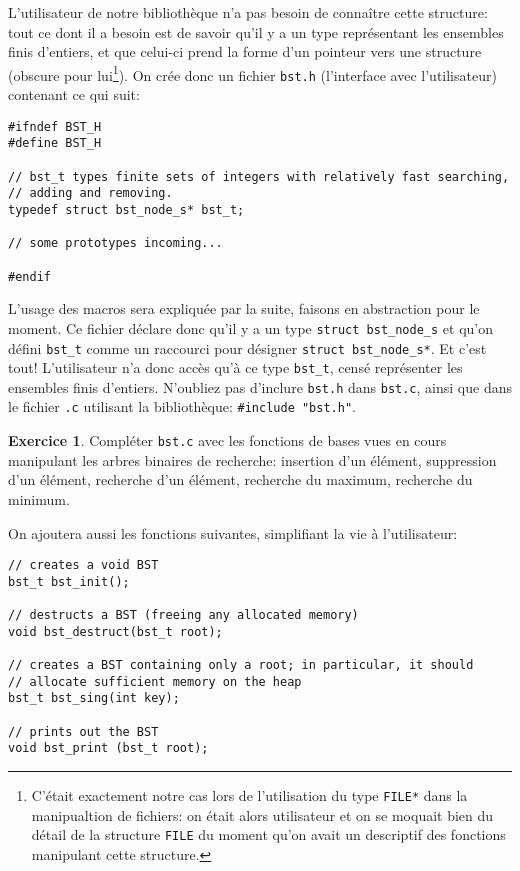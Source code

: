 \documentclass[french,a4paper]{article}
\theoremstyle{definition}
\newtheorem{exercise}{Exercice}
\theoremstyle{remark}
\newcommand{\shell}[1]{\lstinline[style={},style=sh]|#1|}
\newcommand{\inlinec}[1]{\lstinline[style=C]°#1°}
\begin{document}
L'utilisateur de notre bibliothèque n'a pas besoin de connaître cette
structure: tout ce dont il a besoin est de savoir qu'il y a un type
représentant les ensembles finis d'entiers, et que celui-ci prend la
forme d'un pointeur vers une structure (obscure pour
lui\footnote{C'était exactement notre cas lors de l'utilisation du
  type \inlinec{FILE*} dans la manipualtion de fichiers: on était
  alors utilisateur et on se moquait bien du détail de la structure
  \inlinec{FILE} du moment qu'on avait un descriptif des fonctions
  manipulant cette structure.}). On crée donc un fichier \shell{bst.h}
(l'interface avec l'utilisateur) contenant ce qui suit:
\begin{lstlisting}
#ifndef BST_H
#define BST_H

// bst_t types finite sets of integers with relatively fast searching,
// adding and removing.
typedef struct bst_node_s* bst_t;

// some prototypes incoming...

#endif
\end{lstlisting}
L'usage des macros sera expliquée par la suite, faisons en abstraction
pour le moment. Ce fichier déclare donc qu'il y a un type
\inlinec{struct bst_node_s} et qu'on défini \inlinec{bst_t} comme un
raccourci pour désigner \inlinec{struct bst_node_s*}. Et c'est tout!
L'utilisateur n'a donc accès qu'à ce type \inlinec{bst_t}, censé
représenter les ensembles finis d'entiers. N'oubliez pas d'inclure
\shell{bst.h} dans \shell{bst.c}, ainsi que dans le fichier \shell{.c}
utilisant la bibliothèque: \inlinec{#include "bst.h"}.

\begin{exercise}
  Compléter \inlinec{bst.c} avec les fonctions de bases vues en cours
  manipulant les arbres binaires de recherche: insertion d'un élément,
  suppression d'un élément, recherche d'un élément, recherche du
  maximum, recherche du minimum.

  On ajoutera aussi les fonctions suivantes, simplifiant la vie à
  l'utilisateur:
\begin{lstlisting}
// creates a void BST
bst_t bst_init();

// destructs a BST (freeing any allocated memory)
void bst_destruct(bst_t root); 

// creates a BST containing only a root; in particular, it should 
// allocate sufficient memory on the heap
bst_t bst_sing(int key);

// prints out the BST
void bst_print (bst_t root);
\end{lstlisting}
\end{exercise}
\end{document}
